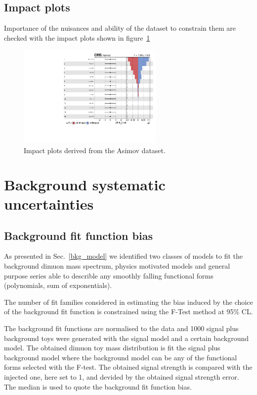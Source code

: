 \subsection*{Impact plots}
Importance of the nuisances and ability of the dataset to constrain them are checked with the impact plots shown in figure~\ref{fig:impacts}
\begin{figure}[h!]
    \centering
    \includegraphics[width=0.631\textwidth]{figures/sig_syst/impacts.pdf}
    \caption{Impact plots derived from the Asimov dataset.}
    \label{fig:impacts}
\end{figure}

\section{Background systematic uncertainties}
\label{bkg_syst}

\subsection{Background fit function bias}
As presented in Sec.~\ref{bkg_model} we identified two classes of models to fit the background
dimuon mass spectrum, physics
motivated models and general purpose series able to describle any smoothly falling
functional forms (polynomials, sum of exponentials).

The number of fit families considered in estimating the bias induced by the choice
of the background fit function is constrained using the F-Test method at 95\% CL.

The background fit functions are normalised to the data and 1000
signal plus background toys were generated with the signal model and
a certain background model. The obtained dimuon toy mass distribution
is fit the signal plus background model where the background model
can be any of the functional forms selected with the F-test. The obtained signal strength
is compared with the injected one, here set to 1, and devided by the obtained signal strength
error. The median is used to quote the background fit function bias.

